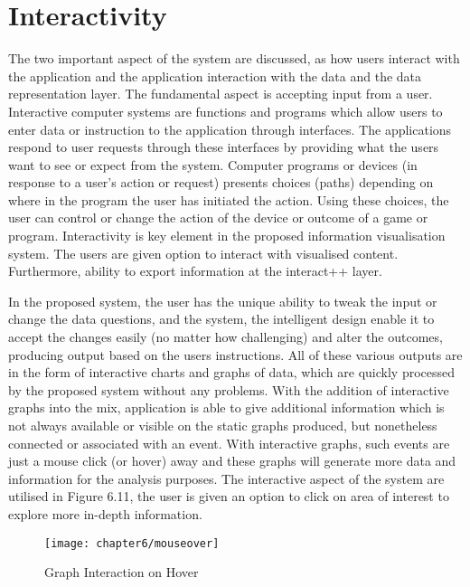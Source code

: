 \section{Interactivity}

The two important aspect of the system are discussed, as how users interact with the application and the application interaction with the data and the data representation layer. The fundamental aspect is accepting input from a user. Interactive computer systems are functions and programs which allow users to enter data or instruction to the application through interfaces. The applications respond to user requests through these interfaces by providing what the users want to see or expect from the system. Computer programs or devices (in response to a user's action or request) presents choices (paths) depending on where in the program the user has initiated the action. Using these choices, the user can control or change the action of the device or outcome of a game or program. Interactivity is key element in the proposed information visualisation system. The users are given option to interact with visualised content. Furthermore, ability to export information at the interact++ layer. 

In the proposed system, the user has the unique ability to tweak the input or change the data questions, and the system, the intelligent design enable it to accept the changes easily (no matter how challenging) and alter the outcomes, producing output based on the users instructions. All of these various outputs are in the form of interactive charts and graphs of data, which are quickly processed by the proposed system without any problems. With the addition of interactive graphs into the mix, application is able to give additional information which is not always available or visible on the static graphs produced, but nonetheless connected or associated with an event. With interactive graphs, such events are just a mouse click (or hover) away and these graphs will generate more data and information for the analysis purposes. The interactive aspect of the system are utilised in Figure 6.11, the user is given an option to click on area of interest to explore more in-depth information.\\ 

\begin{figure}[H]
\centering
\texttt{[image: chapter6/mouseover]}
\caption{Graph Interaction on Hover}
\end{figure}

